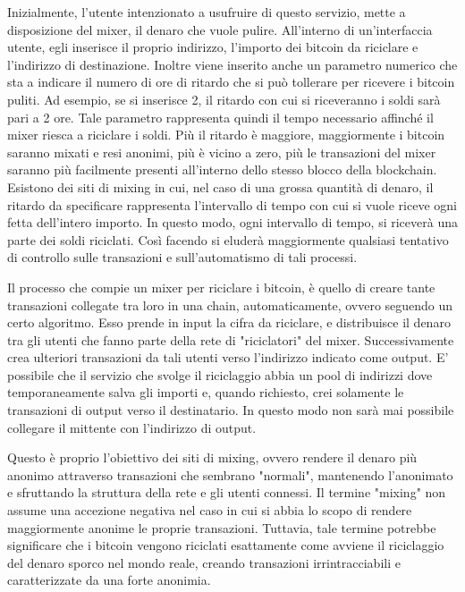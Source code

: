 Inizialmente, l'utente intenzionato a usufruire di questo servizio, mette a disposizione del mixer, il denaro che vuole pulire. All'interno di un'interfaccia utente, egli inserisce il proprio indirizzo, l'importo dei bitcoin da riciclare e l'indirizzo di destinazione. Inoltre viene inserito anche un parametro numerico che sta a indicare il numero di ore di ritardo che si può tollerare per ricevere i bitcoin puliti. Ad esempio, se si inserisce 2, il ritardo con cui si riceveranno i soldi sarà pari a 2 ore. Tale parametro rappresenta quindi il tempo necessario affinché il mixer riesca a riciclare i soldi. Più il ritardo è maggiore, maggiormente i bitcoin saranno mixati e resi anonimi, più è vicino a zero, più le transazioni del mixer saranno più facilmente presenti all'interno dello stesso blocco della blockchain.
Esistono dei siti di mixing in cui, nel caso di una grossa quantità di denaro, il ritardo da specificare rappresenta l'intervallo di tempo con cui si vuole riceve ogni fetta dell'intero importo. In questo modo, ogni intervallo di tempo, si riceverà una parte dei soldi riciclati. Così facendo si eluderà maggiormente qualsiasi tentativo di controllo sulle transazioni e sull'automatismo di tali processi.

Il processo che compie un mixer per riciclare i bitcoin, è quello di creare tante transazioni collegate tra loro in una chain, automaticamente, ovvero seguendo un certo algoritmo. Esso prende in input la cifra da riciclare, e distribuisce il denaro tra gli utenti che fanno parte della rete di "riciclatori" del mixer. Successivamente crea ulteriori transazioni da tali utenti verso l'indirizzo indicato come output. E' possibile che il servizio che svolge il riciclaggio abbia un pool di indirizzi dove temporaneamente salva gli importi e, quando richiesto, crei solamente le transazioni di output verso il destinatario. In questo modo non sarà mai possibile collegare il mittente con l'indirizzo di output. 

Questo è proprio l'obiettivo dei siti di mixing, ovvero rendere il denaro più anonimo attraverso transazioni che sembrano "normali", mantenendo l'anonimato e sfruttando la struttura della rete e gli utenti connessi. Il termine "mixing" non assume una accezione negativa nel caso in cui si abbia lo scopo di rendere maggiormente anonime le proprie transazioni. Tuttavia, tale termine potrebbe significare che i bitcoin vengono riciclati esattamente come avviene il riciclaggio del denaro sporco nel mondo reale, creando transazioni irrintracciabili e caratterizzate da una forte anonimia.
